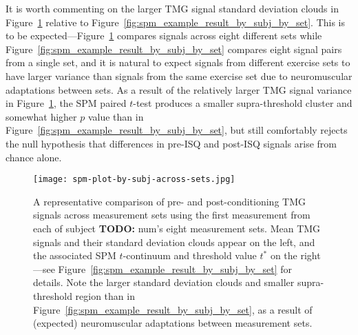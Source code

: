 \documentclass[utf8]{FrontiersinHarvard}
\newcommand{\TODO}[1]{{\textbf{TODO:} {\color{red} #1}}}
\begin{document}
It is worth commenting on the larger TMG signal standard deviation clouds in Figure~\ref{fig:spm_example_result_by_subj_across_sets} relative to Figure~\ref{fig:spm_example_result_by_subj_by_set}.
This is to be expected---Figure~\ref{fig:spm_example_result_by_subj_across_sets} compares signals across eight different sets while Figure~\ref{fig:spm_example_result_by_subj_by_set} compares eight signal pairs from a single set, and it is natural to expect signals from different exercise sets to have larger variance than signals from the same exercise set due to neuromuscular adaptations between sets.
As a result of the relatively larger TMG signal variance in Figure~\ref{fig:spm_example_result_by_subj_across_sets}, the SPM paired $ t $-test produces a smaller supra-threshold cluster and somewhat higher $ p $ value than in Figure~\ref{fig:spm_example_result_by_subj_by_set}, but still comfortably rejects the null hypothesis that differences in pre-ISQ and post-ISQ signals arise from chance alone.

\begin{table}
    \centering
    \caption{A statistical comparison of pre-ISQ and post-ISQ TMG parameters across measurement sets using the first measurement from each of subject \TODO{num}'s eight measurement sets.
    Note the generally larger standard deviations in parameter values relative to Table~\ref{tab:tmg_params_by_subj_by_set}, in which parameter values all come from one set (rather than eight),
    mirroring the trend in Figures~\ref{fig:spm_example_result_by_subj_by_set} and~\ref{fig:spm_example_result_by_subj_across_sets}.}
    \vspace{1ex}
    \renewcommand{\arraystretch}{1.2}
    
    \label{tab:tmg_params_by_subj_across_sets}
\end{table}

\begin{figure}
	\centering
    \texttt{[image: spm-plot-by-subj-across-sets.jpg]}
    \caption{A representative comparison of pre- and post-conditioning TMG signals across measurement sets using the first measurement from each of subject \TODO{num}'s eight measurement sets.
    Mean TMG signals and their standard deviation clouds appear on the left, and the associated SPM $ t $-continuum and threshold value $ t^{*} $ on the right---see Figure~\ref{fig:spm_example_result_by_subj_by_set} for details.
    Note the larger standard deviation clouds and smaller supra-threshold region than in Figure~\ref{fig:spm_example_result_by_subj_by_set}, as a result of (expected) neuromuscular adaptations between measurement sets.}
    \label{fig:spm_example_result_by_subj_across_sets}
\end{figure}
\end{document}
